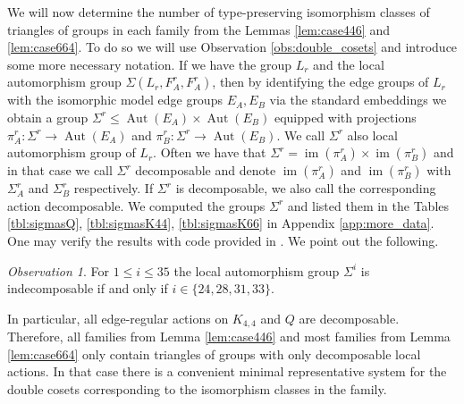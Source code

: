\documentclass[dvipsnames]{article}
\theoremstyle{definition}
\theoremstyle{remark}
\newtheorem{observation}[theorem]{Observation}
\DeclareMathOperator{\Aut}{Aut}
\DeclareMathOperator{\im}{im}
\begin{document}
    We will now determine the number of type-preserving isomorphism classes of triangles of groups in each family from the Lemmas \ref{lem:case446} and \ref{lem:case664}. To do so we will use Observation \ref{obs:double_cosets} and introduce some more necessary notation.
    If we have the group $L_r$ and the local automorphism group $\Sigma(L_r, F_A^r, F_A^r)$, then by identifying the edge groups of $L_r$ with the isomorphic model edge groups $E_A, E_B$ via the standard embeddings we obtain a group $\Sigma^r \leq \Aut(E_A)\times \Aut(E_B)$ equipped with projections $\pi_A^r : \Sigma^r \to \Aut(E_A)$ and $\pi_B^r: \Sigma^r \to \Aut(E_B)$.
    We call $\Sigma^r$ also local automorphism group of $L_r$.
    Often we have that $\Sigma^r = \im(\pi^r_A) \times \im(\pi^r_B)$ and in that case we call $\Sigma^r$ decomposable and denote $\im(\pi^r_A)$ and $\im(\pi^r_B)$ with $\Sigma^r_A$ and $\Sigma^r_B$ respectively.
    If $\Sigma^r$ is decomposable, we also call the corresponding action decomposable.
    We computed the groups $\Sigma^r$ and listed them in the Tables \ref{tbl:sigmasQ}, \ref{tbl:sigmasK44}, \ref{tbl:sigmasK66} in Appendix \ref{app:more_data}. 
    One may verify the results with code provided in \cite{ChamberRegularCode}.
    We point out the following.
    
    \begin{observation}
        For $1 \leq i \leq 35$ the local automorphism group $\Sigma^i$ is indecomposable if and only if $i \in \{24, 28,31,33\}$.
    \end{observation}

    In particular, all edge-regular actions on $K_{4,4}$ and $Q$ are decomposable. Therefore, all families from Lemma \ref{lem:case446} and most families from Lemma \ref{lem:case664} only contain triangles of groups with only decomposable local actions. In that case there is a convenient minimal representative system for the double cosets corresponding to the isomorphism classes in the family.
\end{document}
